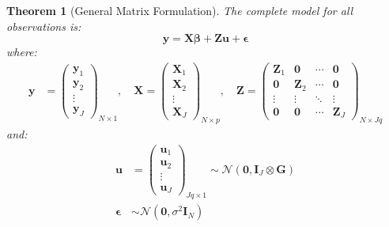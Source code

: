 \documentclass{article}
\newtheorem{theorem}{Theorem}
\begin{document}
\begin{theorem}[General Matrix Formulation]
The complete model for all observations is:
\begin{equation}
\mathbf{y} = \mathbf{X}\boldsymbol{\beta} + \mathbf{Z}\mathbf{u} + \boldsymbol{\epsilon}
\end{equation}
where:
\begin{align}
\mathbf{y} &= \begin{pmatrix} \mathbf{y}_1 \\ \mathbf{y}_2 \\ \vdots \\ \mathbf{y}_J \end{pmatrix}_{N \times 1}, \quad
\mathbf{X} = \begin{pmatrix} \mathbf{X}_1 \\ \mathbf{X}_2 \\ \vdots \\ \mathbf{X}_J \end{pmatrix}_{N \times p}, \quad
\mathbf{Z} = \begin{pmatrix} \mathbf{Z}_1 & \mathbf{0} & \cdots & \mathbf{0} \\ 
                          \mathbf{0} & \mathbf{Z}_2 & \cdots & \mathbf{0} \\
                          \vdots & \vdots & \ddots & \vdots \\
                          \mathbf{0} & \mathbf{0} & \cdots & \mathbf{Z}_J \end{pmatrix}_{N \times Jq}
\end{align}
and:
\begin{align}
\mathbf{u} &= \begin{pmatrix} \mathbf{u}_1 \\ \mathbf{u}_2 \\ \vdots \\ \mathbf{u}_J \end{pmatrix}_{Jq \times 1} \sim \mathcal{N}(\mathbf{0}, \mathbf{I}_J \otimes \mathbf{G}) \\
\boldsymbol{\epsilon} &\sim \mathcal{N}(\mathbf{0}, \sigma^2\mathbf{I}_N)
\end{align}
\end{theorem}
\end{document}
